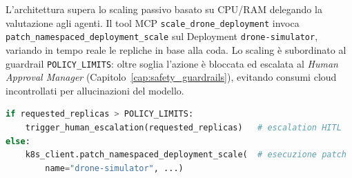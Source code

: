 L'architettura supera lo scaling passivo basato su CPU/RAM delegando la valutazione agli agenti. Il tool MCP \texttt{scale\_drone\_deployment} invoca \texttt{patch\_namespaced\_deployment\_scale} sul Deployment \texttt{drone-simulator}, variando in tempo reale le repliche in base alla coda. Lo scaling è subordinato al guardrail \texttt{POLICY\_LIMITS}: oltre soglia l'azione è bloccata ed escalata al \textit{Human Approval Manager} (Capitolo~\ref{cap:safety_guardrails}), evitando consumi cloud incontrollati per allucinazioni del modello.

\begin{lstlisting}[language=Python, caption={Guardrail di sicurezza applicato alle richieste di scaling dell'agente.}, label={lst:safety_limits_scale}]
if requested_replicas > POLICY_LIMITS:
    trigger_human_escalation(requested_replicas)   # escalation HITL
else:
    k8s_client.patch_namespaced_deployment_scale(  # esecuzione patch
        name="drone-simulator", ...)
\end{lstlisting}
